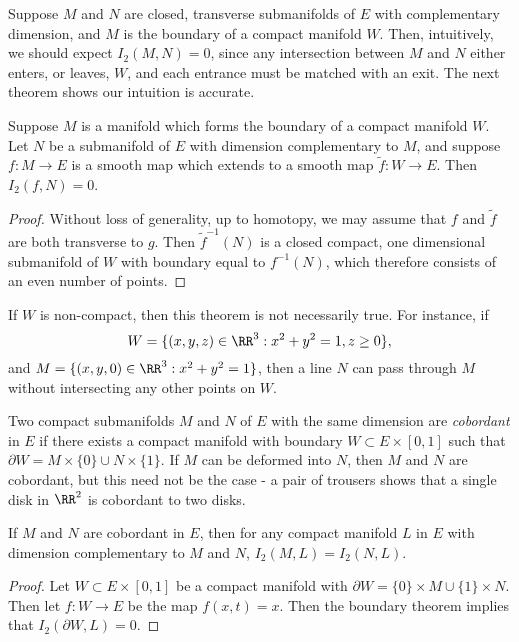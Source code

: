 Suppose $M$ and $N$ are closed, transverse submanifolds of $E$ with complementary dimension, and $M$ is the boundary of a compact manifold $W$. Then, intuitively, we should expect $I_2(M,N) = 0$, since any intersection between $M$ and $N$ either enters, or leaves, $W$, and each entrance must be matched with an exit. The next theorem shows our intuition is accurate.

\begin{theorem}
    Suppose $M$ is a manifold which forms the boundary of a compact manifold $W$. Let $N$ be a submanifold of $E$ with dimension complementary to $M$, and suppose $f: M \to E$ is a smooth map which extends to a smooth map $\tilde{f}: W \to E$. Then $I_2(f,N) = 0$.
\end{theorem}
\begin{proof}
    Without loss of generality, up to homotopy, we may assume that $f$ and $\tilde{f}$ are both transverse to $g$. Then $\tilde{f}^{-1}(N)$ is a closed compact, one dimensional submanifold of $W$ with boundary equal to $f^{-1}(N)$, which therefore consists of an even number of points.
\end{proof}

\begin{remark}
    If $W$ is non-compact, then this theorem is not necessarily true. For instance, if
    \[ W = \{ (x,y,z) \in \RR^3: x^2 + y^2 = 1, z \geq 0 \}, \]
    and $M = \{ (x,y,0) \in \RR^3: x^2 + y^2 = 1 \}$, then a line $N$ can pass through $M$ without intersecting any other points on $W$.
\end{remark}

Two compact submanifolds $M$ and $N$ of $E$ with the same dimension are \emph{cobordant} in $E$ if there exists a compact manifold with boundary $W \subset E \times [0,1]$ such that $\partial W = M \times \{ 0 \} \cup N \times \{ 1 \}$. If $M$ can be deformed into $N$, then $M$ and $N$ are cobordant, but this need not be the case - a pair of trousers shows that a single disk in $\RR^2$ is cobordant to two disks.

\begin{theorem}
    If $M$ and $N$ are cobordant in $E$, then for any compact manifold $L$ in $E$ with dimension complementary to $M$ and $N$, $I_2(M,L) = I_2(N,L)$.
\end{theorem}
\begin{proof}
    Let $W \subset E \times [0,1]$ be a compact manifold with $\partial W = \{ 0 \} \times M \cup \{ 1 \} \times N$. Then let $f: W \to E$ be the map $f(x,t) = x$. Then the boundary theorem implies that $I_2(\partial W,L) = 0$.
\end{proof}

